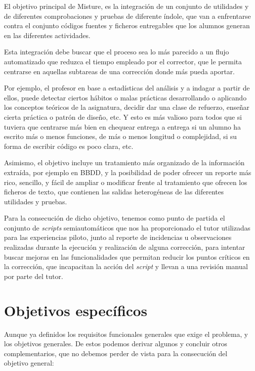 El objetivo principal de Misture, es la integración de un conjunto de utilidades y de diferentes comprobaciones y pruebas de diferente índole, que van a enfrentarse contra el conjunto códigos fuentes y ficheros entregables que los alumnos generan en las diferentes actividades.


Esta integración debe buscar que el proceso sea lo más parecido a un flujo automatizado que reduzca el tiempo empleado por el corrector, que le permita centrarse en aquellas subtareas de una corrección donde más pueda aportar.


Por ejemplo, el profesor en base a estadísticas del análisis y a indagar a partir de ellos, puede detectar ciertos hábitos o malas prácticas desarrollando o aplicando los conceptos teóricos de la asignatura, decidir dar una clase de refuerzo, enseñar cierta práctica o patrón de diseño, etc. Y esto es más valioso para todos que si tuviera que centrarse más bien en chequear entrega a entrega si un alumno ha escrito más o menos funciones, de más o menos longitud o complejidad, si su forma de escribir código es poco clara, etc.


Asimismo, el objetivo incluye un tratamiento más organizado de la información extraída, por ejemplo en BBDD, y la posibilidad de poder ofrecer un reporte más rico, sencillo, y fácil de ampliar o modificar frente al tratamiento que ofrecen los ficheros de texto, que contienen las salidas heterogéneas de las diferentes utilidades y pruebas.


Para la consecución de dicho objetivo, tenemos como punto de partida el conjunto de \textit{scripts} semiautomáticos que nos ha proporcionado el tutor utilizadas para las experiencias piloto, junto al reporte de incidencias u observaciones realizadas durante la ejecución y realización de alguna corrección, para intentar buscar mejoras en las funcionalidades que permitan reducir los puntos críticos en la corrección, que incapacitan la acción del \textit{script} y llevan a una revisión manual por parte del tutor. 


\section{Objetivos específicos}
\label{sec:obj_esp}


Aunque ya definidos los requisitos funcionales generales que exige el problema, y los objetivos generales. De estos podemos derivar algunos y concluir otros complementarios, que no debemos perder de vista para la consecución del objetivo general:


